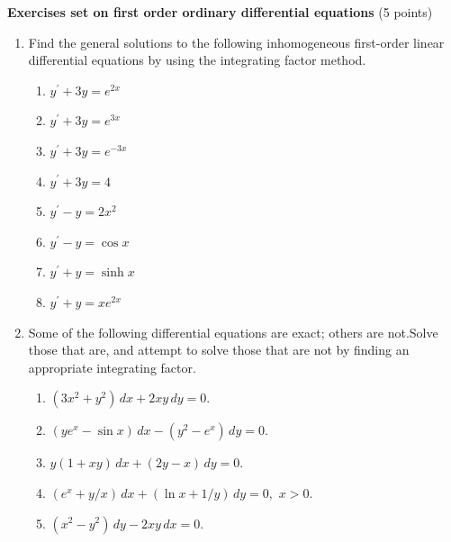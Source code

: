 \documentclass[fleqn]{article}
\begin{document}
  \pagebreak

  \textbf{Exercises set on first order ordinary differential equations} (5 points)

  \begin{enumerate}


    \item Find the general solutions to the following inhomogeneous first-order linear differential equations by using the integrating factor method. 
    
    \begin{enumerate}
      \item $y^{\prime}+3y=e^{2x}$
      
      \item $y^{\prime}+3y=e^{3x}$
      
      \item $y^{\prime}+3y=e^{-3x}$
      
      \item $y^{\prime}+3y=4$
      
      \item $y^{\prime}-y=2x^{2}$
      
      \item $y^{\prime}-y=\cos x$
      
      \item $y^{\prime}+y=\sinh x$
      
      \item $y^{\prime}+y=xe^{2x}$
    \end{enumerate}
    
    \item Some of the following differential equations are exact; others are not.Solve those that are, and attempt to solve those that are not by finding an appropriate integrating factor.
    
    \begin{enumerate}
      \item $(3x^{2}+y^{2})\,dx+2xy\,dy=0$.
      
      \item $\left( ye^{x}-\sin x\right) \,dx-\left( y^{2}-e^{x}\right) \,dy=0$.
      
      \item $y\left( 1+xy\right) \,dx+\left( 2y-x\right) \,dy=0$.
      
      \item $\left( e^{x}+y/x\right) \,dx+\left( \ln x+1/y\right) \,dy=0,$ $x>0$.
      
      \item $\left( x^{2}-y^{2}\right) \,dy-2xy\,dx=0.$
    \end{enumerate}
    

\end{enumerate}
\end{document}
